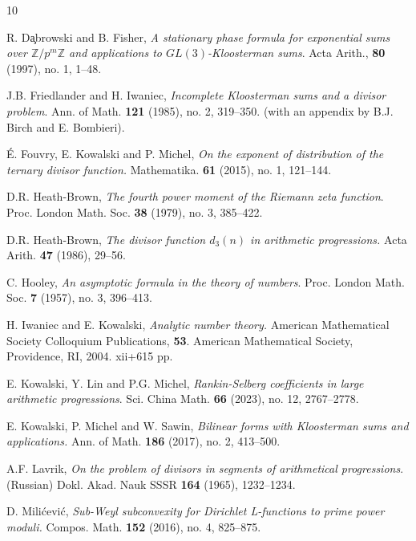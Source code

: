 \documentclass[11pt,reqno]{amsart}
\numberwithin{equation}{section}
\theoremstyle{plain}
\theoremstyle{definition}
\begin{document}

\begin{thebibliography}{10}


R. D\c{a}browski and B. Fisher,
\textit{A stationary phase formula for exponential sums over
  $\mathbb{Z}/p^m\mathbb{Z}$ and applications to $GL(3)$-Kloosterman sums}.
Acta Arith., \textbf{80} (1997), no. 1, 1--48.

J.B. Friedlander and H. Iwaniec, \textit{Incomplete Kloosterman sums and a divisor problem}.
Ann. of Math. \textbf{121} (1985), no. 2, 319--350. (with an appendix by B.J. Birch and E. Bombieri).

\'E. Fouvry, E. Kowalski and P. Michel,
\textit{On the exponent of distribution of the ternary divisor function.}
Mathematika.  \textbf{61} (2015), no. 1, 121--144.

D.R. Heath-Brown,  {\it The fourth power moment of the Riemann zeta function}.
Proc. London Math. Soc. \textbf{38} (1979), no. 3, 385--422.

D.R. Heath-Brown, \textit{The divisor function $d_3(n)$ in arithmetic progressions.}
Acta Arith. \textbf{47} (1986), 29--56.

C. Hooley,  {\it An asymptotic formula in the theory of numbers}. Proc. London Math. Soc.
\textbf{7} (1957), no. 3, 396--413.

H. Iwaniec and E. Kowalski, \textit{Analytic number theory.}
American Mathematical Society Colloquium Publications,
\textbf{53}. American Mathematical Society, Providence, RI, 2004. xii+615 pp.

E. Kowalski, Y. Lin and P.G. Michel, {\it Rankin-Selberg coefficients in large arithmetic progressions}.  
Sci. China Math. {\bf 66} (2023), no. 12, 2767--2778.

E. Kowalski, P. Michel and W. Sawin,
\textit{Bilinear forms with Kloosterman sums and applications.}
Ann. of Math. \textbf{186} (2017), no. 2, 413--500.

A.F. Lavrik,  {\it On the problem of divisors in segments of arithmetical progressions}.
(Russian) Dokl. Akad. Nauk SSSR \textbf{164} (1965), 1232--1234.


D. Mili\'cevi\'c, \textit{Sub-Weyl subconvexity for Dirichlet L-functions to prime power moduli.} 
Compos. Math. \textbf{152} (2016), no. 4, 825--875.


\end{thebibliography}
\end{document}
